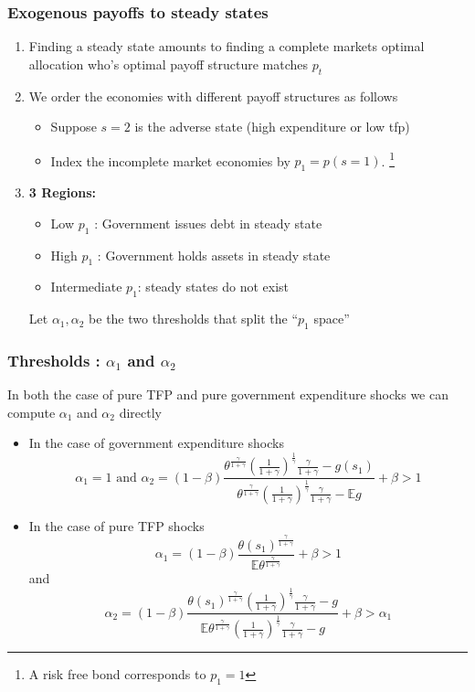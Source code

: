 \documentclass{beamer}
\newcommand{\EE}{\mathbb E}
\begin{document}
 \begin{frame}
  \frametitle{Exogenous payoffs to steady states}
  \begin{enumerate}
   \item Finding a steady state amounts to finding a complete markets optimal allocation who's optimal payoff structure matches $p_t$
  \item We order the economies with different payoff structures as follows
  \begin{itemize}
   \item  Suppose $s=2$ is the adverse state (high expenditure or low tfp)
   \item Index the incomplete market economies by $p_1=p(s=1)$. \footnote{ A risk free bond corresponds to $p_1=1$}
  \end{itemize}
  \item \textbf{3 Regions: }
  \begin{itemize}
   \item Low $p_1$ : Government issues debt in steady state
   \item High $p_1$ : Government holds assets in steady state 
   \item Intermediate $p_1$: steady states do not exist
  \end{itemize}
Let $\alpha_1,\alpha_2$ be the two thresholds   that split the ``$p_1$ space''
  \end{enumerate}
  
 \end{frame}

\begin{frame}
 \frametitle{Thresholds : $\alpha_1$ and $\alpha_2$}
	In both the case of pure TFP and pure government expenditure shocks we can compute $\alpha_1$ and $\alpha_2$ directly
	\begin{itemize}
		\item In the case of government expenditure shocks
		\[
			\alpha_1 = 1 \text{  and }  \alpha_2 = (1-\beta)\frac{\theta^\frac{\gamma}{1+\gamma}\left(\frac{1}{1+\gamma}\right)^\frac1\gamma\frac{\gamma}{1+\gamma}-g(s_1)}{\theta^\frac{\gamma}{1+\gamma}\left(\frac{1}{1+\gamma}\right)^\frac1\gamma\frac{\gamma}{1+\gamma}-\EE g} +\beta>1
		\]
		\item In the case of pure TFP shocks
		\[
			\alpha_1 = (1-\beta)\frac{\theta(s_1)^\frac{\gamma}{1+\gamma}}{\EE\theta^\frac{\gamma}{1+\gamma}}+\beta > 1
		\]and
		\[
		\alpha_2 = (1-\beta)\frac{\theta(s_1)^\frac{\gamma}{1+\gamma}\left(\frac{1}{1+\gamma}\right)^\frac1\gamma\frac{\gamma}{1+\gamma}-g}{\EE\theta^\frac{\gamma}{1+\gamma}\left(\frac{1}{1+\gamma}\right)^\frac1\gamma\frac{\gamma}{1+\gamma}-g}+\beta>\alpha_1
		\]
	\end{itemize}
 \end{frame}
\end{document}
